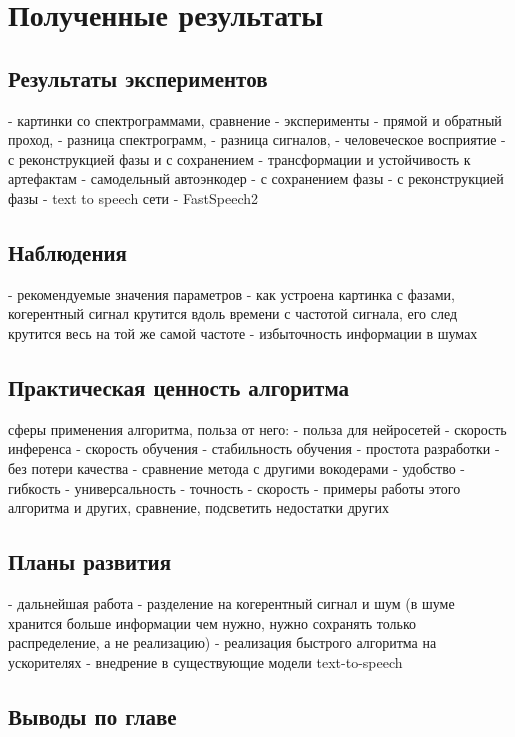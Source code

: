 \chapter{Полученные результаты}

\section{Результаты экспериментов}
\begin{markdown}
  - картинки со спектрограммами, сравнение
  - эксперименты
   - прямой и обратный проход, 
     - разница спектрограмм, 
     - разница сигналов, 
     - человеческое восприятие
     - с реконструкцией фазы и с сохранением
     - трансформации и устойчивость к артефактам
   - самодельный автоэнкодер 
     - с сохранением фазы
	 - с реконструкцией фазы
   - text to speech сети
     - FastSpeech2
\end{markdown}

\section{Наблюдения}
\begin{markdown}
  - рекомендуемые значения параметров
  - как устроена картинка с фазами, когерентный сигнал крутится вдоль времени с частотой сигнала, его след крутится весь на той же самой частоте
  - избыточность информации в шумах
\end{markdown}

\section{Практическая ценность алгоритма}
\begin{markdown}
   сферы применения алгоритма, польза от него:
    - польза для нейросетей
      - скорость инференса
      - скорость обучения
      - стабильность обучения
      - простота разработки
      - без потери качества
  - сравнение метода с другими вокодерами
    - удобство
    - гибкость
    - универсальность
    - точность
    - скорость
  - примеры работы этого алгоритма и других, сравнение, подсветить недостатки других
\end{markdown}

\section{Планы развития}
\begin{markdown}
 - дальнейшая работа
   - разделение на когерентный сигнал и шум (в шуме хранится больше информации чем нужно, нужно сохранять только распределение, а не реализацию)
   - реализация быстрого алгоритма на ускорителях
   - внедрение в существующие модели text-to-speech
\end{markdown}

\section{Выводы по главе}